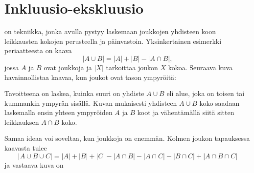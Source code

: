 \section{Inkluusio-ekskluusio}


on tekniikka, jonka avulla pystyy laskemaan
joukkojen yhdisteen koon leikkausten
kokojen perusteella ja päinvastoin.
Yksinkertainen esimerkki periaatteesta on kaava
\[ |A \cup B| = |A| + |B| - |A \cap B|,\]
jossa $A$ ja $B$ ovat joukkoja ja $|X|$
tarkoittaa joukon $X$ kokoa.
Seuraava kuva havainnollistaa kaavaa,
kun joukot ovat tason ympyröitä:

\begin{center}
\end{center}

Tavoitteena on laskea, kuinka suuri on yhdiste $A \cup B$
eli alue, joka on toisen tai kummankin ympyrän sisällä.
Kuvan mukaisesti yhdisteen $A \cup B$ koko
saadaan laskemalla ensin yhteen ympyröiden $A$ ja $B$ koot
ja vähentämällä siitä sitten leikkauksen $A \cap B$ koko.

Samaa ideaa voi soveltaa, kun joukkoja on enemmän.
Kolmen joukon tapauksessa kaavasta tulee
\[ |A \cup B \cup C| = |A| + |B| + |C| - |A \cap B|  - |A \cap C|  - |B \cap C| + |A \cap B \cap C| \]
ja vastaava kuva on

\begin{center}
\end{center}

